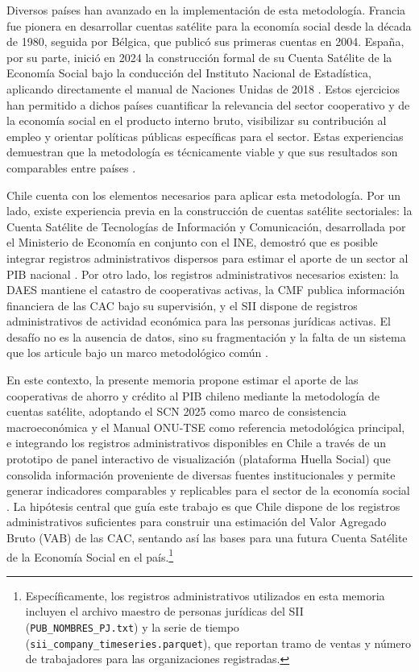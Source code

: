 Diversos países han avanzado en la implementación de esta metodología. Francia fue pionera en desarrollar cuentas satélite para la economía social desde la década de 1980, seguida por Bélgica, que publicó sus primeras cuentas en 2004. España, por su parte, inició en 2024 la construcción formal de su Cuenta Satélite de la Economía Social bajo la conducción del Instituto Nacional de Estadística, aplicando directamente el manual de Naciones Unidas de 2018 \cite{noauthor_cuenta_2024}. Estos ejercicios han permitido a dichos países cuantificar la relevancia del sector cooperativo y de la economía social en el producto interno bruto, visibilizar su contribución al empleo y orientar políticas públicas específicas para el sector. Estas experiencias demuestran que la metodología es técnicamente viable y que sus resultados son comparables entre países \cite{archambault_lester_2022}.
 
Chile cuenta con los elementos necesarios para aplicar esta metodología. Por un lado, existe experiencia previa en la construcción de cuentas satélite sectoriales: la Cuenta Satélite de Tecnologías de Información y Comunicación, desarrollada por el Ministerio de Economía en conjunto con el INE, demostró que es posible integrar registros administrativos dispersos para estimar el aporte de un sector al PIB nacional \cite{noauthor_cuenta_2006}. Por otro lado, los registros administrativos necesarios existen: la DAES mantiene el catastro de cooperativas activas, la CMF publica información financiera de las CAC
bajo su supervisión, y el SII dispone de registros administrativos de actividad económica para las personas jurídicas activas. El desafío no es la ausencia de datos, sino su fragmentación y la falta de un sistema que los articule bajo un marco metodológico común .
 
En este contexto, la presente memoria propone estimar el aporte de las
cooperativas de ahorro y crédito al PIB chileno mediante la metodología
de cuentas satélite, adoptando el SCN 2025 como marco de consistencia
macroeconómica y el Manual ONU-TSE 
como referencia metodológica principal, e integrando los registros
administrativos disponibles en Chile a través de un prototipo de panel interactivo de visualización (plataforma Huella Social) que consolida información proveniente de diversas fuentes institucionales y permite generar indicadores comparables y replicables para el sector de la economía social . La hipótesis
central que guía este trabajo es que Chile dispone de los registros
administrativos suficientes para construir una estimación del Valor Agregado
Bruto (VAB) de las CAC, sentando así las bases para una futura Cuenta
Satélite de la Economía Social en el país.\footnote{Específicamente, los registros administrativos utilizados en esta memoria incluyen el archivo maestro de personas jurídicas del SII (\texttt{PUB\_NOMBRES\_PJ.txt}) y la serie de tiempo (\texttt{sii\_company\_timeseries.parquet}), que reportan tramo de ventas y número de trabajadores para las organizaciones registradas.}
 

